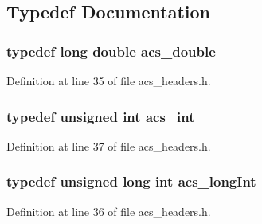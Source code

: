 \subsection{Typedef Documentation}
\hypertarget{a00066_ab776853a005fcbf56af0424a2a4dd607}{
\subsubsection[{acs\-\_\-double}]{\setlength{\rightskip}{0pt plus 5cm}typedef long double {\bf acs\-\_\-double}}}\label{a00066_ab776853a005fcbf56af0424a2a4dd607}


Definition at line 35 of file acs\-\_\-headers.\-h.

\hypertarget{a00066_a8d277355641a098190360234e2ebde35}{
\subsubsection[{acs\-\_\-int}]{\setlength{\rightskip}{0pt plus 5cm}typedef unsigned int {\bf acs\-\_\-int}}}\label{a00066_a8d277355641a098190360234e2ebde35}


Definition at line 37 of file acs\-\_\-headers.\-h.

\hypertarget{a00066_a19319d75f02db4308bc5c0026d98cd85}{
\subsubsection[{acs\-\_\-long\-Int}]{\setlength{\rightskip}{0pt plus 5cm}typedef unsigned long int {\bf acs\-\_\-long\-Int}}}\label{a00066_a19319d75f02db4308bc5c0026d98cd85}


Definition at line 36 of file acs\-\_\-headers.\-h.

